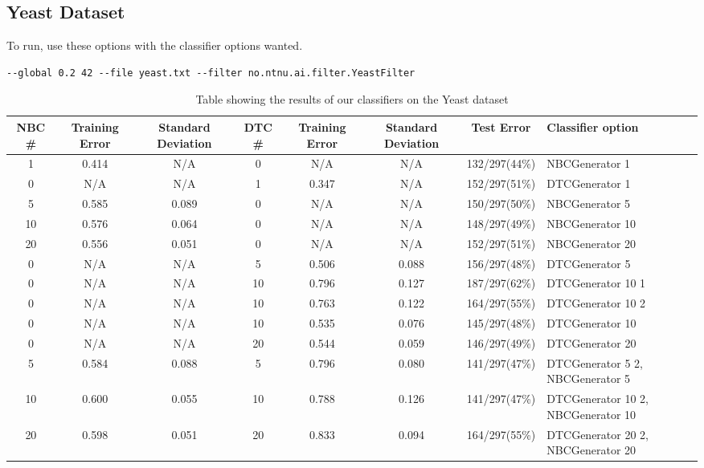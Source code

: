 \subsection{Yeast Dataset}\label{yeast}


To run, use these options with the classifier options wanted.

\begin{lstlisting}[label=lst:yeast, caption=Yeast dataset general 
options]
--global 0.2 42 --file yeast.txt --filter no.ntnu.ai.filter.YeastFilter
\end{lstlisting}

\begin{landscape}
\begin{table}
\begin{tabular}{|c|c|c||c|c|c||c||p{5cm}|}
\hline
NBC \# & Training Error & Standard Deviation & DTC \# & Training Error
& Standard Deviation & Test Error & Classifier option \\ \hline
1 & 0.414 & N/A & 0 & N/A & N/A & 132/297(44\%) & NBCGenerator 1 \\ \hline
0 & N/A & N/A & 1 & 0.347 & N/A & 152/297(51\%) & DTCGenerator 1 \\ \hline
5 & 0.585 & 0.089 & 0 & N/A & N/A & 150/297(50\%) & NBCGenerator 5 \\ \hline
10 & 0.576 & 0.064 & 0 & N/A & N/A & 148/297(49\%) & NBCGenerator 10 \\ \hline
20 & 0.556 & 0.051 & 0 & N/A & N/A & 152/297(51\%) & NBCGenerator 20 \\ \hline
0 & N/A & N/A & 5 & 0.506 & 0.088 & 156/297(48\%) & DTCGenerator 5 \\ \hline
0 & N/A & N/A & 10 & 0.796 & 0.127 & 187/297(62\%) & DTCGenerator 10 1 \\ 
\hline
0 & N/A & N/A & 10 & 0.763 & 0.122 & 164/297(55\%) & DTCGenerator 10 2 \\ 
\hline
0 & N/A & N/A & 10 & 0.535 & 0.076 & 145/297(48\%) & DTCGenerator 10 \\ \hline
0 & N/A & N/A & 20 & 0.544 & 0.059 & 146/297(49\%) & DTCGenerator 20 \\ \hline
5 & 0.584 & 0.088 & 5 & 0.796 & 0.080 & 141/297(47\%) & DTCGenerator 5 2, 
\newline NBCGenerator 5 \\ \hline
10 & 0.600 & 0.055 & 10 & 0.788 & 0.126 & 141/297(47\%) & DTCGenerator 10 2, 
\newline NBCGenerator 10 \\ \hline
20 & 0.598 & 0.051 & 20 & 0.833 & 0.094 & 164/297(55\%) & DTCGenerator 20 2, 
\newline NBCGenerator 20 \\ \hline
\hline
\end{tabular}
\label{tab:yeast}
\caption[Yeast dataset boosting]{Table showing the results of our classifiers 
on the Yeast dataset}
\end{table}
\end{landscape}
